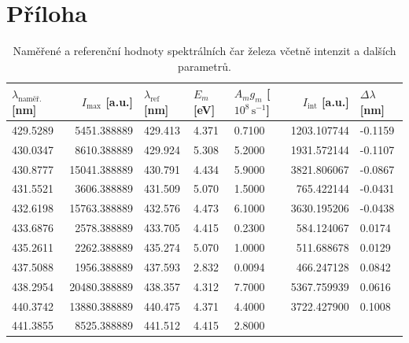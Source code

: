 \documentclass[czech,11pt,a4paper]{article}
\begin{document}
			\section{Příloha}
			\begin{table}[H]
				\centering
				\caption{Naměřené a referenční hodnoty spektrálních čar železa včetně intenzit a dalších parametrů.}
				\label{tab:zelezo_spektrum}
				\begin{tabular}{lrlllrl}
					$\lambda_\mathrm{naměř.}$ [nm] &  $I_\mathrm{max}$ [a.u.] &  $\lambda_\mathrm{ref}$ [nm] &  $E_m$ [eV] &  $A_m g_m$ [$10^8\,\mathrm{s}^{-1}$] &  $I_\mathrm{int}$ [a.u.] &  $\Delta \lambda$ [nm] \\  \hline                    429.5289 &              5451.388889 &                      429.413 &       4.371 &                               0.7100 &              1203.107744 &                -0.1159 \\                      430.0347 &              8610.388889 &                      429.924 &       5.308 &                               5.2000 &              1931.572144 &                -0.1107 \\                 430.8777 &             15041.388889 &                      430.791 &       4.434 &                               5.9000 &              3821.806067 &                -0.0867 \\                       431.5521 &              3606.388889 &                      431.509 &       5.070 &                               1.5000 &               765.422144 &                -0.0431 \\                       432.6198 &             15763.388889 &                      432.576 &       4.473 &                               6.1000 &              3630.195206 &                -0.0438 \\                       433.6876 &              2578.388889 &                      433.705 &       4.415 &                               0.2300 &               584.124067 &                 0.0174 \\                       435.2611 &              2262.388889 &                      435.274 &       5.070 &                               1.0000 &               511.688678 &                 0.0129 \\                       437.5088 &              1956.388889 &                      437.593 &       2.832 &                               0.0094 &               466.247128 &                 0.0842 \\                       438.2954 &             20480.388889 &                      438.357 &       4.312 &                               7.7000 &              5367.759939 &                 0.0616 \\                       440.3742 &             13880.388889 &                      440.475 &       4.371 &                               4.4000 &              3722.427900 &                 0.1008 \\                       441.3855 &              8525.388889 &                      441.512 &       4.415 &                               2.8000 &              
\end{tabular}
\end{table}
\end{document}
